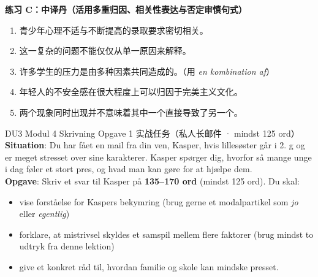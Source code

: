 \textbf{练习 C：中译丹（活用多重归因、相关性表达与否定审慎句式）}
\begin{enumerate}
  \item 青少年心理不适与不断提高的录取要求密切相关。
  \item 这一复杂的问题不能仅仅从单一原因来解释。
  \item 许多学生的压力是由多种因素共同造成的。（用 \textit{en kombination af}）
  \item 年轻人的不安全感在很大程度上可以归因于完美主义文化。
  \item 两个现象同时出现并不意味着其中一个直接导致了另一个。
\end{enumerate}


\begin{emailbox}{DU3 Modul 4 Skrivning Opgave 1 实战任务（私人长邮件 · mindst 125 ord）}
\textbf{Situation}: Du har fået en mail fra din ven, Kasper, hvis lillesøster går i 2. g og er meget stresset over sine karakterer. Kasper spørger dig, hvorfor så mange unge i dag føler et stort pres, og hvad man kan gøre for at hjælpe dem.\\
\textbf{Opgave}: Skriv et svar til Kasper på \textbf{135--170 ord} (mindst 125 ord). Du skal:
\begin{itemize}
  \item vise forståelse for Kaspers bekymring (brug gerne et modalpartikel som \textit{jo} eller \textit{egentlig})
  \item forklare, at mistrivsel skyldes et samspil mellem flere faktorer (brug mindst to udtryk fra denne lektion)
  \item give et konkret råd til, hvordan familie og skole kan mindske presset.
\end{itemize}
\end{emailbox}

